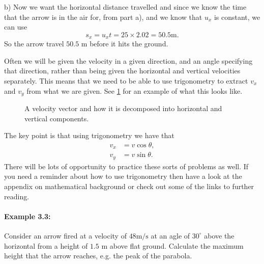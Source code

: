 \documentclass[a4paper,12pt]{book}
\begin{document}
b) Now we want the horizontal distance travelled and since we know the time that the arrow is in the air for, from part a), and we know that $u_{x}$ is constant, we can use 
\begin{equation*}
s_{x}=u_{x}t=25\times 2.02=50.5\text{m}.
\end{equation*}
So the arrow travel $50.5$ m before it hits the ground.

Often we will be given the velocity in a given direction, and an angle specifying that direction, rather than being given the horizontal and vertical velocities separately. This means that we need to be able to use trigonometry to extract $v_{x}$ and $v_{y}$ from what we are given. See \cref{fig: velocity components} for an example of what this looks like. 
\begin{figure}[ht]
    \centering
    \caption{A velocity vector and how it is decomposed into horizontal and vertical components.}
    \label{fig: velocity components}
\end{figure}

The key point is that using trigonometry we have that
\begin{align*}
v_{x}&=v\cos\theta,\\
v_{y}&=v\sin\theta.
\end{align*}
There will be lots of opportunity to practice these sorts of problems as well. If you need a reminder about how to use trigonometry then have a look at the appendix on mathematical background or check out some of the links to further reading.

\paragraph{Example 3.3:} Consider an arrow fired at a velocity of $48\text{m/s}$ at an agle of $30^{\circ}$ above the horizontal from a height of $1.5$ m above flat ground. Calculate the maximum height that the arrow reaches, e.g. the peak of the parabola.\\
\end{document}
